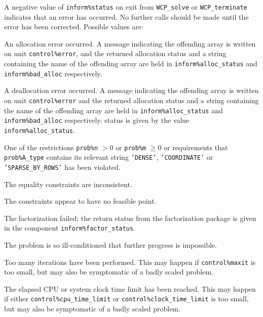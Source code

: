 \documentclass{galahad}
\newcommand{\packagename}{WCP}
\begin{document}

\galerrors
A negative value of {\tt inform\%status} on exit from 
{\tt \packagename\_solve}
or 
{\tt \packagename\_terminate}
indicates that an error has occurred. No further calls should be made
until the error has been corrected. Possible values are:

\begin{description}

 An allocation error occurred. A message indicating the offending 
array is written on unit {\tt control\%error}, and the returned allocation 
status and a string containing the name of the offending array
are held in {\tt inform\%alloc\_\-status}
and {\tt inform\%bad\_alloc} respectively.

 A deallocation error occurred. A message indicating the offending 
array is written on unit {\tt control\%error} and the returned allocation 
status and a string containing the name of the offending array
are held in {\tt inform\%alloc\_\-status}
and {\tt inform\%bad\_alloc} respectively.
status is given by the value {\tt inform\%alloc\_status}.

 One of the restrictions {\tt prob\%n} $> 0$ or {\tt prob\%m} $\geq  0$
    or requirements that {\tt prob\%A\_type} contains its relevant string
    {\tt 'DENSE'}, {\tt 'COORDINATE'}  or {\tt 'SPARSE\_BY\_ROWS'} 
    has been violated.

 The equality constraints are inconsistent.

 The constraints appear to have no feasible point.

 The factorization failed; the return status from the factorization
    package is given in the component {\tt inform\%fac\-t\-or\_status}.

 The problem is so ill-conditioned that further progress is 
   impossible.

 Too many iterations have been performed. This may happen if
    {\tt control\%maxit} is too small, but may also be symptomatic of 
    a badly scaled problem.

 The elapsed CPU or system clock time limit has been 
    reached. This may happen if either {\tt control\%cpu\_time\_limit} or
    {\tt control\%clock\_time\_limit} is too small, but may also be symptomatic 
    of a badly scaled problem.

\end{description}
\end{document}
